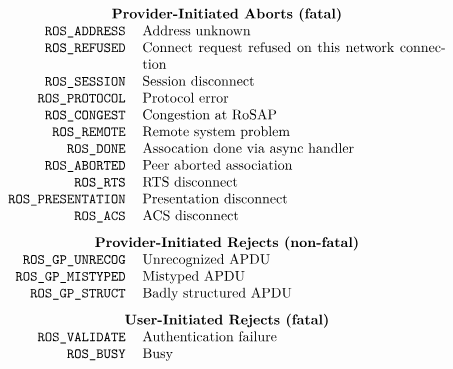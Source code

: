 
\normalsize
\[\begin{tabular}{rp{3.0in}}
    \multicolumn{2}{c}{\bf Provider-Initiated Aborts (fatal)}\\
\tt ROS\_ADDRESS&	Address unknown\\
\tt ROS\_REFUSED&	Connect request refused on this network connection\\
\tt ROS\_SESSION&	Session disconnect\\
\tt ROS\_PROTOCOL&	Protocol error\\
\tt ROS\_CONGEST&	Congestion at RoSAP\\
\tt ROS\_REMOTE&	Remote system problem\\
\tt ROS\_DONE&		Assocation done via async handler\\
\tt ROS\_ABORTED&	Peer aborted association\\
\tt ROS\_RTS&		RTS disconnect\\
\tt ROS\_PRESENTATION&	Presentation disconnect\\
\tt ROS\_ACS&		ACS disconnect\\[0.1in]
    \multicolumn{2}{c}{\bf Provider-Initiated Rejects (non-fatal)}\\
\tt ROS\_GP\_UNRECOG&	Unrecognized APDU\\
\tt ROS\_GP\_MISTYPED&	Mistyped APDU\\
\tt ROS\_GP\_STRUCT&	Badly structured APDU\\[0.1in]
    \multicolumn{2}{c}{\bf User-Initiated Rejects (fatal)}\\
\tt ROS\_VALIDATE&	Authentication failure\\
\tt ROS\_BUSY&		Busy
\end{tabular}\]
